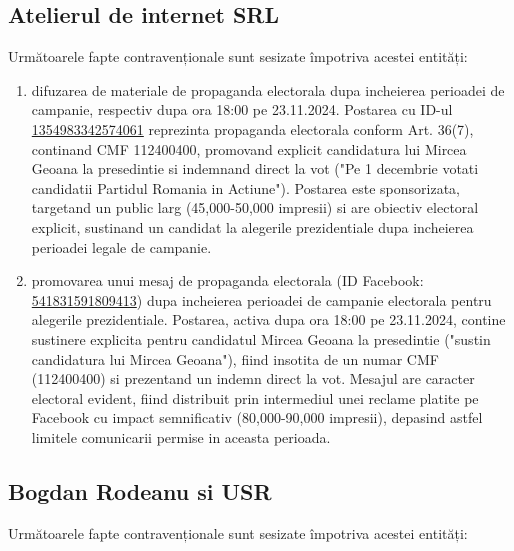 \documentclass[a4paper,12pt]{article}
\begin{document}
\vspace{0.5cm}

\subsection{Atelierul de internet SRL}
Următoarele fapte contravenționale sunt sesizate împotriva acestei entități:

\begin{enumerate}[leftmargin=*, label=\arabic*.)]
    \item difuzarea de materiale de propaganda electorala dupa incheierea perioadei de campanie, respectiv dupa ora 18:00 pe 23.11.2024. Postarea cu ID-ul \href{https://www.facebook.com/ads/library/?id=1354983342574061}{1354983342574061} reprezinta propaganda electorala conform Art. 36(7), continand CMF 112400400, promovand explicit candidatura lui Mircea Geoana la presedintie si indemnand direct la vot ("Pe 1 decembrie votati candidatii Partidul Romania in Actiune"). Postarea este sponsorizata, targetand un public larg (45,000-50,000 impresii) si are obiectiv electoral explicit, sustinand un candidat la alegerile prezidentiale dupa incheierea perioadei legale de campanie.
    \item promovarea unui mesaj de propaganda electorala (ID Facebook: \href{https://www.facebook.com/ads/library/?id=541831591809413}{541831591809413}) dupa incheierea perioadei de campanie electorala pentru alegerile prezidentiale. Postarea, activa dupa ora 18:00 pe 23.11.2024, contine sustinere explicita pentru candidatul Mircea Geoana la presedintie ("sustin candidatura lui Mircea Geoana"), fiind insotita de un numar CMF (112400400) si prezentand un indemn direct la vot. Mesajul are caracter electoral evident, fiind distribuit prin intermediul unei reclame platite pe Facebook cu impact semnificativ (80,000-90,000 impresii), depasind astfel limitele comunicarii permise in aceasta perioada.
\end{enumerate}

\vspace{0.5cm}

\subsection{Bogdan Rodeanu si USR}
Următoarele fapte contravenționale sunt sesizate împotriva acestei entități:
\end{document}
